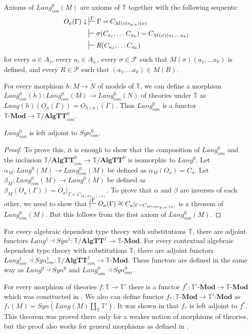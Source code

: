 \documentclass[reqno]{amsart}
\theoremstyle{definition}
\theoremstyle{remark}
\newcommand{\cat}[1]{\mathbf{#1}}
\newcommand{\Mod}[1]{#1\text{-}\cat{Mod}}
\newcommand{\algtt}{\cat{AlgTT}}
\numberwithin{figure}{section}
\begin{document}
Axioms of $Lang^0_{con}(M)$ are axioms of $\mathbb{T}$ together with the following sequents:
\begin{align*}
O_a(\Gamma) \downarrow & \sststile{}{\Gamma} \Gamma = C_{M(ctx_{p,n})(a)}\\
& \sststile{}{} \sigma(C_{a_1}, \ldots C_{a_k}) = C_{M(\sigma)(a_1, \ldots a_k)} \\
& \sststile{}{} R(C_{a_1}, \ldots C_{a_k})
\end{align*}
for every $a \in A_s$, every $a_i \in A_{s_i}$,
every $\sigma \in \mathcal{F}$ such that $M(\sigma)(a_1, \ldots a_k)$ is defined,
and every $R \in \mathcal{P}$ such that $(a_1, \ldots a_k) \in M(R)$.

For every morphism $h : M \to N$ of models of $\mathbb{T}$, we can define a morphism $Lang^0_{con}(h) : Lang^0_{con}(M) \to Lang^0_{con}(N)$ of theories under $\mathbb{T}$ as $Lang(h)(O_a(\Gamma)) = O_{h(a)}(\Gamma)$.
Thus $Lang^0_{con}$ is a functor $\Mod{\mathbb{T}} \to \mathbb{T}/\algtt^0_{con}$.

\begin{prop}
$Lang^0_{con}$ is left adjoint to $Syn^0_{con}$.
\end{prop}
\begin{proof}
To prove this, it is enough to show that the composition of $Lang^0_{con}$ and the inclusion $\mathbb{T}/\algtt^0_{con} \to \mathbb{T}/\algtt^0$ is isomorphic to $Lang^0$.
Let $\alpha_M : Lang^0(M) \to Lang^0_{con}(M)$ be defined as $\alpha_M(O_a) = C_a$.
Let $\beta_M : Lang^0_{con}(M) \to Lang^0(M)$ be defined as $\beta_M(O_a(\Gamma)) = O_a|_{\Gamma = C_{M(ctx_{p,n})(a)}}$.
To prove that $\alpha$ and $\beta$ are inverses of each other, we need to show that $\sststile{}{\Gamma} O_a(\Gamma) \cong C_a|_{\Gamma = C_{M(ctx_{p,n})(a)}}$ is a theorem of $Lang^0_{con}(M)$.
But this follows from the first axiom of $Lang^0_{con}(M)$.
\end{proof}

For every algebraic dependent type theory with substitutions $\mathbb{T}$, there are adjoint functors $Lang^1 \dashv Syn^1 : \mathbb{T}/\algtt^1 \to \Mod{\mathbb{T}}$.
For every contextual algebraic dependent type theory with substitutions $\mathbb{T}$, there are adjoint functors $Lang^1_{con} \dashv Syn^1_{con} : \mathbb{T}/\algtt^1_{con} \to \Mod{\mathbb{T}}$.
These functors are defined in the same way as $Lang^0 \dashv Syn^0$ and $Lang^0_{con} \dashv Syn^0_{con}$.

For every morphism of theories $f : \mathbb{T} \to \mathbb{T}'$ there is a functor $f^* : \Mod{\mathbb{T}'} \to \Mod{\mathbb{T}}$ which was consttucted in \cite{alg-tt}.
We also can define functor $f_* : \Mod{\mathbb{T}} \to \Mod{\mathbb{T}'}$ as $f_*(M) = Syn(Lang(M) \amalg_{\mathbb{T}} \mathbb{T}')$.
It was shown in \cite{PHL} that $f_*$ is left adjoint to $f^*$.
This theorem was proved there only for a weaker notion of morphisms of theories, but the proof also works for general morphisms as defined in \cite{alg-tt}.



\end{document}
